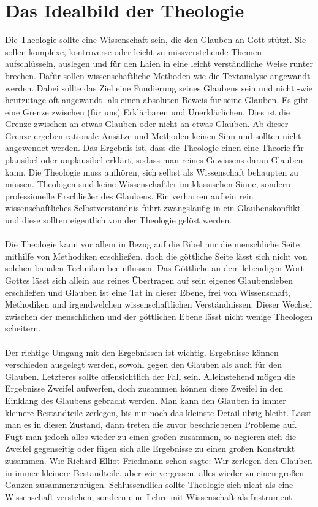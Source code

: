 \section{Das Idealbild der Theologie}
Die Theologie sollte eine Wissenschaft sein, die den Glauben an Gott stützt. Sie sollen komplexe, kontroverse oder leicht zu missverstehende Themen aufschlüsseln, auslegen und für den Laien in eine leicht verständliche Weise runter brechen. Dafür sollen wissenschaftliche Methoden wie die Textanalyse angewandt werden. Dabei sollte das Ziel eine Fundierung seines Glaubens sein und nicht -wie heutzutage oft angewandt- als einen absoluten Beweis für seine Glauben. Es gibt eine Grenze zwischen (für uns) Erklärbaren und Unerklärlichen. Dies ist die Grenze zwischen an etwas Glauben oder nicht an etwas Glauben. Ab dieser Grenze ergeben rationale Ansätze und Methoden keinen Sinn und sollten nicht angewendet werden. Das Ergebnis ist, dass die Theologie einen eine Theorie für plausibel oder unplausibel erklärt, sodass man reines Gewissens daran Glauben kann. Die Theologie muss aufhören, sich selbst als Wissenschaft behaupten zu müssen. Theologen sind keine Wissenschaftler im klassischen Sinne, sondern professionelle Erschließer des Glaubens. Ein verharren auf ein rein wissenschaftliches Selbstverständnis führt zwangsläufig in ein Glaubenskonflikt und diese sollten eigentlich von der Theologie gelöst werden. 
\\ ~ \\
Die Theologie kann vor allem in Bezug auf die Bibel nur die menschliche Seite mithilfe von Methodiken erschließen, doch die göttliche Seite lässt sich nicht von solchen banalen Techniken beeinflussen. Das Göttliche an dem lebendigen Wort Gottes lässt sich allein aus reines Übertragen auf sein eigenes Glaubensleben erschließen und Glauben ist eine Tat in dieser Ebene, frei von Wissenschaft, Methodiken und irgendwelchen wissenschaftlichen Verständnissen. Dieser Wechsel zwischen der menschlichen und der göttlichen Ebene lässt nicht wenige Theologen scheitern.
\\ ~ \\
Der richtige Umgang mit den Ergebnissen ist wichtig. Ergebnisse können verschieden ausgelegt werden, sowohl gegen den Glauben als auch für den Glauben. Letzteres sollte offensichtlich der Fall sein. Alleinstehend mögen die Ergebnisse Zweifel aufwerfen, doch zusammen können diese Zweifel in den Einklang des Glaubens gebracht werden. Man kann den Glauben in immer kleinere Bestandteile zerlegen, bis nur noch das kleinste Detail übrig bleibt. Lässt man es in diesen Zustand, dann treten die zuvor beschriebenen Probleme auf. Fügt man jedoch alles wieder zu einen großen zusammen, so negieren sich die Zweifel gegenseitig oder fügen sich alle Ergebnisse zu einen großen Konstrukt zusammen. Wie Richard Elliot Friedmann schon sagte: \glqq Wir zerlegen den Glauben in immer kleinere Bestandteile, aber wir vergessen, alles wieder zu einen großen Ganzen zusammenzufügen\grqq. Schlussendlich sollte Theologie sich nicht als eine Wissenschaft verstehen, sondern eine Lehre mit Wissenschaft als Instrument.
